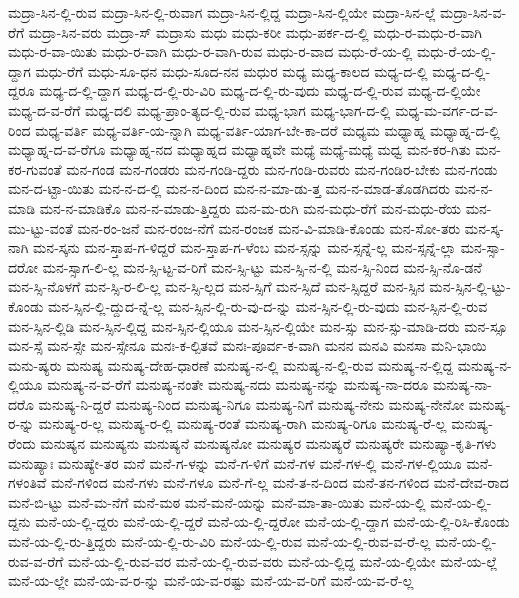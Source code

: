 {ಮದ್ರಾ-ಸಿನ-ಲ್ಲಿ-ರುವ
ಮದ್ರಾ-ಸಿನ-ಲ್ಲಿ-ರುವಾಗ
ಮದ್ರಾ-ಸಿನ-ಲ್ಲಿದ್ದ
ಮದ್ರಾ-ಸಿನ-ಲ್ಲಿಯೇ
ಮದ್ರಾ-ಸಿನ-ಲ್ಲೆ
ಮದ್ರಾ-ಸಿನ-ವ-ರೆಗೆ
ಮದ್ರಾ-ಸಿನ-ವರು
ಮದ್ರಾ-ಸ್
ಮದ್ರಾಸು
ಮಧು
ಮಧು-ಕರೀ
ಮಧು-ಪರ್ಕ-ದ-ಲ್ಲಿ
ಮಧು-ರ-ಮಧು-ರ-ವಾಗಿ
ಮಧು-ರ-ವಾ-ಯಿತು
ಮಧು-ರ-ವಾಗಿ
ಮಧು-ರ-ವಾಗಿ-ರುವ
ಮಧು-ರ-ವಾದ
ಮಧು-ರೆ-ಯ-ಲ್ಲಿ
ಮಧು-ರೆ-ಯ-ಲ್ಲಿ-ದ್ದಾಗ
ಮಧು-ರೆಗೆ
ಮಧು-ಸೂ-ಧನ
ಮಧು-ಸೂದ-ನನ
ಮಧುರ
ಮಧ್ಯ
ಮಧ್ಯ-ಕಾಲದ
ಮಧ್ಯ-ದ-ಲ್ಲಿ
ಮಧ್ಯ-ದ-ಲ್ಲಿ-ದ್ದರೂ
ಮಧ್ಯ-ದ-ಲ್ಲಿ-ದ್ದಾಗ
ಮಧ್ಯ-ದ-ಲ್ಲಿ-ರು-ವಿರಿ
ಮಧ್ಯ-ದ-ಲ್ಲಿ-ರು-ವುದು
ಮಧ್ಯ-ದ-ಲ್ಲಿ-ರುವ
ಮಧ್ಯ-ದ-ಲ್ಲಿಯೇ
ಮಧ್ಯ-ದ-ವ-ರೆಗೆ
ಮಧ್ಯ-ದಲಿ
ಮಧ್ಯ-ಪ್ರಾಂ-ತ್ಯದ-ಲ್ಲಿ-ರುವ
ಮಧ್ಯ-ಭಾಗ
ಮಧ್ಯ-ಭಾಗ-ದ-ಲ್ಲಿ
ಮಧ್ಯ-ಮ-ವರ್ಗ-ದ-ವ-ರಿಂದ
ಮಧ್ಯ-ವರ್ತಿ
ಮಧ್ಯ-ವರ್ತಿ-ಯ-ನ್ನಾಗಿ
ಮಧ್ಯ-ವರ್ತಿ-ಯಾಗ-ಬೇ-ಕಾ-ದರೆ
ಮಧ್ಯಮ
ಮಧ್ಯಾಹ್ನ
ಮಧ್ಯಾಹ್ನ-ದ-ಲ್ಲಿ
ಮಧ್ಯಾಹ್ನ-ದ-ವ-ರೆಗೂ
ಮಧ್ಯಾಹ್ನ-ನದ
ಮಧ್ಯಾಹ್ನದ
ಮಧ್ಯಾಹ್ನವೇ
ಮಧ್ಯೆ
ಮಧ್ಯೆ-ಮಧ್ಯೆ
ಮಧ್ವ
ಮನ-ಕರ-ಗಿತು
ಮನ-ಕರ-ಗುವಂತೆ
ಮನ-ಗಂಡ
ಮನ-ಗಂಡರು
ಮನ-ಗಂಡಿ-ದ್ದರು
ಮನ-ಗಂಡಿ-ರುವರು
ಮನ-ಗಂಡಿರ-ಬೇಕು
ಮನ-ಗಂಡು
ಮನ-ದ-ಟ್ಟಾ-ಯಿತು
ಮನ-ನ-ದ-ಲ್ಲಿ
ಮನ-ನ-ದಿಂದ
ಮನ-ನ-ಮಾ-ಡು-ತ್ತ
ಮನ-ನ-ಮಾಡ-ತೊಡಗಿದರು
ಮನ-ನ-ಮಾಡಿ
ಮನ-ನ-ಮಾಡಿಕೊ
ಮನ-ನ-ಮಾಡು-ತ್ತಿದ್ದರು
ಮನ-ಮ-ರುಗಿ
ಮನ-ಮಧು-ರೆಗೆ
ಮನ-ಮಧು-ರೆಯ
ಮನ-ಮು-ಟ್ಟು-ವಂತೆ
ಮನ-ರಂ-ಜನೆ
ಮನ-ರಂಜ-ನೆಗೆ
ಮನ-ರಂಜಕ
ಮನ-ವಿ-ಮಾಡಿ-ಕೊಂಡು
ಮನ-ಸೋ-ತರು
ಮನ-ಸ್ಕ-ನಾಗಿ
ಮನ-ಸ್ಕನು
ಮನ-ಸ್ತಾಪ-ಗ-ಳಿದ್ದರೆ
ಮನ-ಸ್ತಾಪ-ಗ-ಳೆಂಬ
ಮನ-ಸ್ಸನ್ನು
ಮನ-ಸ್ಸನ್ನೆ-ಲ್ಲ
ಮನ-ಸ್ಸನ್ನೆ-ಲ್ಲಾ
ಮನ-ಸ್ಸಾ-ದರೋ
ಮನ-ಸ್ಸಾಗ-ಲಿ-ಲ್ಲ
ಮನ-ಸ್ಸಿ-ಟ್ಟ-ವ-ರಿಗೆ
ಮನ-ಸ್ಸಿ-ಟ್ಟು
ಮನ-ಸ್ಸಿ-ನ-ಲ್ಲಿ
ಮನ-ಸ್ಸಿ-ನಿಂದ
ಮನ-ಸ್ಸಿ-ನೊ-ಡನೆ
ಮನ-ಸ್ಸಿ-ನೊಳಗೆ
ಮನ-ಸ್ಸಿ-ರ-ಲಿ-ಲ್ಲ
ಮನ-ಸ್ಸಿ-ಲ್ಲದ
ಮನ-ಸ್ಸಿಗೆ
ಮನ-ಸ್ಸಿದೆ
ಮನ-ಸ್ಸಿದ್ದರೆ
ಮನ-ಸ್ಸಿನ
ಮನ-ಸ್ಸಿನ-ಲ್ಲಿ-ಟ್ಟು-ಕೊಂಡು
ಮನ-ಸ್ಸಿನ-ಲ್ಲಿ-ದ್ದುದ-ನ್ನೆ-ಲ್ಲ
ಮನ-ಸ್ಸಿನ-ಲ್ಲಿ-ರು-ವು-ದ-ನ್ನು
ಮನ-ಸ್ಸಿನ-ಲ್ಲಿ-ರು-ವುದು
ಮನ-ಸ್ಸಿನ-ಲ್ಲಿ-ರುವ
ಮನ-ಸ್ಸಿನ-ಲ್ಲಿಡಿ
ಮನ-ಸ್ಸಿನ-ಲ್ಲಿದ್ದ
ಮನ-ಸ್ಸಿನ-ಲ್ಲಿಯೂ
ಮನ-ಸ್ಸಿನ-ಲ್ಲಿಯೇ
ಮನ-ಸ್ಸು
ಮನ-ಸ್ಸು-ಮಾಡಿ-ದರು
ಮನ-ಸ್ಸೂ
ಮನ-ಸ್ಸೆ
ಮನ-ಸ್ಸೇ
ಮನ-ಸ್ಸೇನೂ
ಮನಃ-ಕ-ಲ್ಪಿತವೆ
ಮನಃ-ಪೂರ್ವ-ಕ-ವಾಗಿ
ಮನನ
ಮನವಿ
ಮನಸಾ
ಮನಿ-ಭಾಯಿ
ಮನು-ಷ್ಯರು
ಮನುಷ್ಯ
ಮನುಷ್ಯ-ದೇಹ-ಧಾರಣೆ
ಮನುಷ್ಯ-ನ-ಲ್ಲಿ
ಮನುಷ್ಯ-ನ-ಲ್ಲಿ-ರುವ
ಮನುಷ್ಯ-ನ-ಲ್ಲಿದ್ದ
ಮನುಷ್ಯ-ನ-ಲ್ಲಿಯೂ
ಮನುಷ್ಯ-ನ-ವ-ರೆಗೆ
ಮನುಷ್ಯ-ನಂತೇ
ಮನುಷ್ಯ-ನದು
ಮನುಷ್ಯ-ನನ್ನು
ಮನುಷ್ಯ-ನಾ-ದರೂ
ಮನುಷ್ಯ-ನಾ-ದರೊ
ಮನುಷ್ಯ-ನಿ-ದ್ದರೆ
ಮನುಷ್ಯ-ನಿಂದ
ಮನುಷ್ಯ-ನಿಗೂ
ಮನುಷ್ಯ-ನಿಗೆ
ಮನುಷ್ಯ-ನೇನು
ಮನುಷ್ಯ-ನೇನೋ
ಮನುಷ್ಯ-ರ-ನ್ನು
ಮನುಷ್ಯ-ರ-ಲ್ಲ
ಮನುಷ್ಯ-ರ-ಲ್ಲಿ
ಮನುಷ್ಯ-ರಂತೆ
ಮನುಷ್ಯ-ರಾಗಿ
ಮನುಷ್ಯ-ರಿಗೂ
ಮನುಷ್ಯ-ರೆ-ಲ್ಲ
ಮನುಷ್ಯ-ರೆಂದು
ಮನುಷ್ಯನ
ಮನುಷ್ಯನು
ಮನುಷ್ಯನೆ
ಮನುಷ್ಯನೋ
ಮನುಷ್ಯರ
ಮನುಷ್ಯರೆ
ಮನುಷ್ಯರೇ
ಮನುಷ್ಯಾ-ಕೃತಿ-ಗಳು
ಮನುಷ್ಯಾಃ
ಮನುಷ್ಯೇ-ತರ
ಮನೆ
ಮನೆ-ಗ-ಳನ್ನು
ಮನೆ-ಗ-ಳಿಗೆ
ಮನೆ-ಗಳ
ಮನೆ-ಗಳ-ಲ್ಲಿ
ಮನೆ-ಗಳ-ಲ್ಲಿಯೂ
ಮನೆ-ಗಳಂತಿವೆ
ಮನೆ-ಗಳಿಂದ
ಮನೆ-ಗಳು
ಮನೆ-ಗಳೂ
ಮನೆ-ಗೆ-ಲ್ಲ
ಮನೆ-ತ-ನ-ದಿಂದ
ಮನೆ-ತನ-ಗಳಿಂದ
ಮನೆ-ದೇವ-ರಾದ
ಮನೆ-ಬಿ-ಟ್ಟು
ಮನೆ-ಮ-ನೆಗೆ
ಮನೆ-ಮಠ
ಮನೆ-ಮನೆ-ಯನ್ನು
ಮನೆ-ಮಾ-ತಾ-ಯಿತು
ಮನೆ-ಯ-ಲ್ಲಿ
ಮನೆ-ಯ-ಲ್ಲಿ-ದ್ದನು
ಮನೆ-ಯ-ಲ್ಲಿ-ದ್ದರು
ಮನೆ-ಯ-ಲ್ಲಿ-ದ್ದರೆ
ಮನೆ-ಯ-ಲ್ಲಿ-ದ್ದರೋ
ಮನೆ-ಯ-ಲ್ಲಿ-ದ್ದಾಗ
ಮನೆ-ಯ-ಲ್ಲಿ-ರಿಸಿ-ಕೊಂಡು
ಮನೆ-ಯ-ಲ್ಲಿ-ರು-ತ್ತಿದ್ದರು
ಮನೆ-ಯ-ಲ್ಲಿ-ರು-ವಿರಿ
ಮನೆ-ಯ-ಲ್ಲಿ-ರುವ
ಮನೆ-ಯ-ಲ್ಲಿ-ರುವ-ವ-ರೆ-ಲ್ಲ
ಮನೆ-ಯ-ಲ್ಲಿ-ರುವ-ವ-ರೆಗೆ
ಮನೆ-ಯ-ಲ್ಲಿ-ರುವ-ವರ
ಮನೆ-ಯ-ಲ್ಲಿ-ರುವ-ವರು
ಮನೆ-ಯ-ಲ್ಲಿದ್ದ
ಮನೆ-ಯ-ಲ್ಲಿಯೇ
ಮನೆ-ಯ-ಲ್ಲೆ
ಮನೆ-ಯ-ಲ್ಲೇ
ಮನೆ-ಯ-ವ-ರ-ನ್ನು
ಮನೆ-ಯ-ವ-ರಷ್ಟು
ಮನೆ-ಯ-ವ-ರಿಗೆ
ಮನೆ-ಯ-ವ-ರೆ-ಲ್ಲ
}
